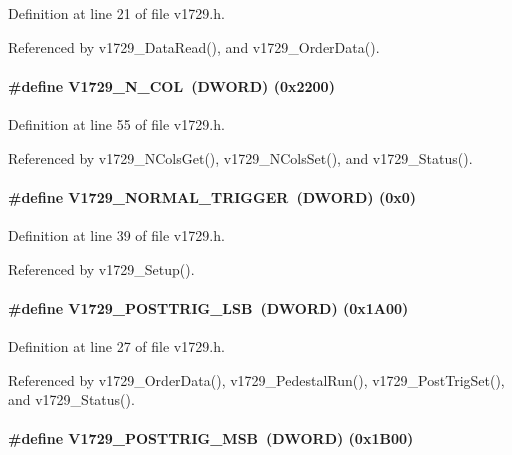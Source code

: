 Definition at line 21 of file v1729.h.

Referenced by v1729\_\-DataRead(), and v1729\_\-OrderData().
\paragraph[{V1729\_\-N\_\-COL}]{\setlength{\rightskip}{0pt plus 5cm}\#define V1729\_\-N\_\-COL~({\bf DWORD}) (0x2200)}\hfill\label{v1729_8h_a3e017020c741719f0a902bd7516d610a}


Definition at line 55 of file v1729.h.

Referenced by v1729\_\-NColsGet(), v1729\_\-NColsSet(), and v1729\_\-Status().
\paragraph[{V1729\_\-NORMAL\_\-TRIGGER}]{\setlength{\rightskip}{0pt plus 5cm}\#define V1729\_\-NORMAL\_\-TRIGGER~({\bf DWORD})   (0x0)}\hfill\label{v1729_8h_ab6a844941b76c2e2a64729a94a3d6eff}


Definition at line 39 of file v1729.h.

Referenced by v1729\_\-Setup().
\paragraph[{V1729\_\-POSTTRIG\_\-LSB}]{\setlength{\rightskip}{0pt plus 5cm}\#define V1729\_\-POSTTRIG\_\-LSB~({\bf DWORD}) (0x1A00)}\hfill\label{v1729_8h_a47d49090b8456cb8a1bdc45492205ff5}


Definition at line 27 of file v1729.h.

Referenced by v1729\_\-OrderData(), v1729\_\-PedestalRun(), v1729\_\-PostTrigSet(), and v1729\_\-Status().
\paragraph[{V1729\_\-POSTTRIG\_\-MSB}]{\setlength{\rightskip}{0pt plus 5cm}\#define V1729\_\-POSTTRIG\_\-MSB~({\bf DWORD}) (0x1B00)}\hfill\label{v1729_8h_a7d4e2f06c2f568d4adb348b5151749bc}


